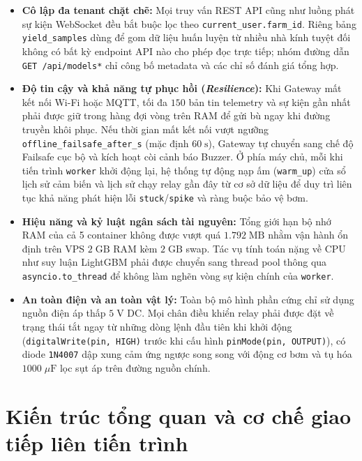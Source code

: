 \begin{itemize}[leftmargin=*]
    \item \textbf{Cô lập đa tenant chặt chẽ:} Mọi truy vấn REST API cũng như luồng phát sự kiện WebSocket đều bắt buộc lọc theo \texttt{current\_user.farm\_id}. Riêng bảng \texttt{yield\_samples} dùng để gom dữ liệu huấn luyện từ nhiều nhà kính tuyệt đối không có bất kỳ endpoint API nào cho phép đọc trực tiếp; nhóm đường dẫn \texttt{GET /api/models*} chỉ công bố metadata và các chỉ số đánh giá tổng hợp.
    \item \textbf{Độ tin cậy và khả năng tự phục hồi (\textit{Resilience}):} Khi Gateway mất kết nối Wi-Fi hoặc MQTT, tối đa \(150\) bản tin telemetry và sự kiện gần nhất phải được giữ trong hàng đợi vòng trên RAM để gửi bù ngay khi đường truyền khôi phục. Nếu thời gian mất kết nối vượt ngưỡng \texttt{offline\_failsafe\_after\_s} (mặc định \(60\;\text{s}\)), Gateway tự chuyển sang chế độ Failsafe cục bộ và kích hoạt còi cảnh báo Buzzer. Ở phía máy chủ, mỗi khi tiến trình \texttt{worker} khởi động lại, hệ thống tự động nạp ấm (\texttt{warm\_up}) cửa sổ lịch sử cảm biến và lịch sử chạy relay gần đây từ cơ sở dữ liệu để duy trì liên tục khả năng phát hiện lỗi \texttt{stuck}/\texttt{spike} và ràng buộc bảo vệ bơm.
    \item \textbf{Hiệu năng và kỷ luật ngân sách tài nguyên:} Tổng giới hạn bộ nhớ RAM của cả 5 container không được vượt quá \(1.792\;\text{MB}\) nhằm vận hành ổn định trên VPS \(2\;\text{GB}\) RAM kèm \(2\;\text{GB}\) swap. Tác vụ tính toán nặng về CPU như suy luận LightGBM phải được chuyển sang thread pool thông qua \texttt{asyncio.to\_thread} để không làm nghẽn vòng sự kiện chính của \texttt{worker}.
    \item \textbf{An toàn điện và an toàn vật lý:} Toàn bộ mô hình phần cứng chỉ sử dụng nguồn điện áp thấp \(5\;\text{V DC}\). Mọi chân điều khiển relay phải được đặt về trạng thái tắt ngay từ những dòng lệnh đầu tiên khi khởi động (\texttt{digitalWrite(pin, HIGH)} trước khi cấu hình \texttt{pinMode(pin, OUTPUT)}), có diode \texttt{1N4007} dập xung cảm ứng ngược song song với động cơ bơm và tụ hóa \(1000\;\mu\text{F}\) lọc sụt áp trên đường nguồn chính.
\end{itemize}

\section{Kiến trúc tổng quan và cơ chế giao tiếp liên tiến trình}
\label{sec:c3-architecture}

